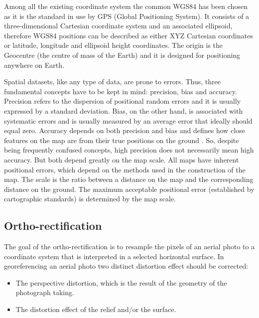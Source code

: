 Among all the existing coordinate system the common WGS84 has been chosen as it is the standard in use by GPS (Global Positioning System). It consists of a three-dimensional Cartesian coordinate system and an associated ellipsoid, therefore WGS84 positions can be described as either XYZ Cartesian coordinates or latitude, longitude and ellipsoid height coordinates. The origin is the Geocentre (the centre of mass of the Earth) and it is designed for positioning anywhere on Earth.\\

Spatial datasets, like any type of data, are prone to errors. Thus, three fundamental concepts have to be kept in mind: precision, bias and accuracy. Precision refers to the dispersion of positional random errors and it is usually expressed by a standard deviation. Bias, on the other hand, is associated with systematic errors and is usually measured by an average error that ideally should equal zero. Accuracy depends on both precision and bias and defines how close features on the map are from their true positions on the ground \cite{geoInformationSystem}. So, despite being frequently confused concepts, high precision does not necessarily mean high accuracy. But both depend greatly on the map scale. All maps have inherent positional errors, which depend on the methods used in the construction of the map. The scale is the ratio between a distance on the map and the corresponding distance on the ground. The maximum acceptable positional error (established by cartographic standards) is determined by the map scale.

\subsection{Ortho-rectification} %
\label{sub:ortho_rectification}
The goal of the ortho-rectification is to resample the pixels of an aerial photo to a coordinate system that is interpreted in a selected horizontal surface.
In georeferencing an aerial photo two distinct distortion effect should be corrected:
\begin{itemize}
	\item The perspective distortion, which is the result of the geometry of the photograph taking.
	\item The distortion effect of the relief and/or the surface.
\end{itemize}

